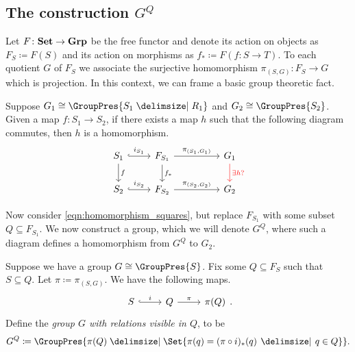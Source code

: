 
\subsection{The construction \texorpdfstring{$G^Q$}{G\^Q}}

Let $F \colon \mathbf{Set} \to \mathbf{Grp}$ be the free functor and denote its action on objects as $F_S \coloneqq F(S)$ and its action on morphisms as  $f_* \coloneqq F(f \colon S \to T)$.
To each quotient $G$ of $F_S$ we associate the surjective homomorphism $\pi_{(S,G)} \colon F_S \to G$ which is projection.
In this context, we can frame a basic group theoretic fact.

\begin{basic_fact}
	\label{thm:homomorphism_squares}
	Suppose $G_1 \cong \GroupPres{S_1 \relations R_1}$ and $G_2 \cong \GroupPres{S_2}$.
	Given a map $f \colon S_1 \to S_2$, if there exists a map  $h$ such that the following diagram commutes, then $h$ is a homomorphism.
	\begin{equation}
		\begin{tikzcd}
			S_1 \ar[d, "f"] \ar[r, hook, "i_{S_1}"] & F_{S_1} \ar[d, "f_*"] \ar[rr, "\pi_{(S_1, G_1)}"] & & \ar[d, color=red, "\exists h?"] G_1 \\
			S_2 \ar[r, hook, "i_{S_2}"] & F_{S_2} \ar[rr, "\pi_{(S_2, G_2)}"] & & G_2
		\end{tikzcd}
		\label{eqn:homomorphism_squares}
	\end{equation}
\end{basic_fact}

Now consider \eqref{eqn:homomorphism_squares}, but replace $F_{S_1}$ with some subset $Q \subseteq F_{S_1}$.
We now construct a group, which we will denote $G^Q$, where such a diagram defines a homomorphism from $G^Q$ to $G_2$.

\begin{definition}
	Suppose we have a group $G \cong \GroupPres{S}$.
	Fix some $Q \subseteq F_S$ such that $S \subseteq Q$.
	Let $\pi \coloneq \pi_{(S,G)}$.
	We have the following maps.
	\[
		\begin{tikzcd}
			S \ar[r, hook, "i"] & Q \ar[r, "\pi"] & \pi(Q)
		\end{tikzcd}
		.\]
	Define the \emph{group $G$ with relations visible in $Q$}, to be
	\[
		G^Q \coloneqq \GroupPres{\pi(Q) \relations \Set{\pi(q) = (\pi \circ i)_*(q) \given q \in Q} }
		.\]
	\label{def:G_Q}
\end{definition}

